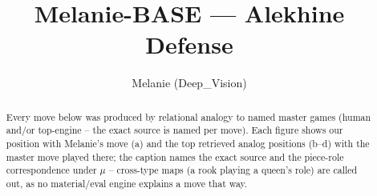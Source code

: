 \documentclass[11pt]{article}
\title{Melanie-BASE — Alekhine Defense}
\author{Melanie (Deep\_Vision)}
\date{}
\begin{document}
\maketitle

\begin{abstract}Every move below was produced by relational analogy to named master games (human and/or top-engine -- the exact source is named per move). Each figure shows our position with Melanie's move (a) and the top retrieved analog positions (b--d) with the master move played there; the caption names the exact source and the piece-role correspondence under $\mu$ -- cross-type maps (a rook playing a queen's role) are called out, as no material/eval engine explains a move that way.\end{abstract}

\begin{figure}[p]\centering
\begin{subfigure}{0.46\textwidth}\centering
\resizebox{\linewidth}{!}{%
\newchessgame
\chessboard[
  setfen={rnbqk2r/ppp1ppbp/1n1P2p1/8/3P4/1B3N2/PPP2PPP/RNBQK2R b KQkq - 0 7},
  showmover=false,
  pgfstyle=straightmove, color=movearrow, markmove={c7-d6}
]}
\caption{}
\end{subfigure}\hfill
\begin{subfigure}{0.46\textwidth}\centering
\resizebox{\linewidth}{!}{%
\newchessgame
\chessboard[
  setfen={rnbqk2r/ppp1ppbp/1n1P2p1/8/2PP4/5N2/PP2BPPP/RNBQK2R b KQkq - 0 7},
  showmover=false,
  pgfstyle=straightmove, color=movearrow, markmove={c7-d6}
]}
\caption{}
\end{subfigure}
\\[4pt]
\begin{subfigure}{0.46\textwidth}\centering
\resizebox{\linewidth}{!}{%
\newchessgame
\chessboard[
  setfen={rnbqk2r/ppp1ppbp/1n1P2p1/8/2PP4/5N2/PP2BPPP/RNBQK2R b KQkq - 0 7},
  showmover=false,
  pgfstyle=straightmove, color=movearrow, markmove={c7-d6}
]}
\caption{}
\end{subfigure}\hfill
\begin{subfigure}{0.46\textwidth}\centering
\resizebox{\linewidth}{!}{%
\newchessgame
\chessboard[
  setfen={rnbqk2r/ppp1ppbp/1n1P2p1/8/2PP4/5N2/PP2BPPP/RNBQK2R b KQkq - 0 7},
  showmover=false,
  pgfstyle=straightmove, color=movearrow, markmove={c7-d6}
]}
\caption{}
\end{subfigure}

\end{figure}
\end{document}
